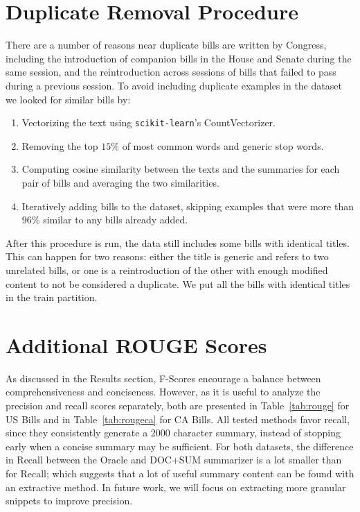 \documentclass[11pt,a4paper]{article}
\begin{document}





\appendix

\section{Duplicate Removal Procedure}
\label{sec:duplicates}
There are a number of reasons near duplicate bills are written by Congress, including the introduction of companion bills in the House and Senate during the same session, and the reintroduction across sessions of bills that failed to pass during a previous session.
To avoid including duplicate examples in the dataset we looked for similar bills by: 
\begin{enumerate}
    \item Vectorizing the text using \texttt{scikit-learn}'s CountVectorizer.
    \item Removing the top $15\%$ of most common words and generic stop words.
    \item Computing cosine similarity between the texts and the summaries for each pair of bills and averaging the two similarities.
    \item Iteratively adding bills to the dataset, skipping examples that were more than $96\%$ similar to any bills already added.
\end{enumerate} 


After this procedure is run, the data still includes some bills with identical titles. This can happen for two reasons: either the title is generic and refers to two unrelated bills, or one is a reintroduction of the other with enough modified content to not be considered a duplicate. We put all the bills with identical titles in the train partition.

\section{Additional ROUGE Scores}

As discussed in the Results section, F-Scores encourage a balance between comprehensiveness and conciseness. However, as it is useful to analyze the precision and recall scores separately, both are presented in Table~\ref{tab:rouge} for US Bills and in Table~\ref{tab:rougeca} for CA Bills. All tested methods favor recall, since they consistently generate a 2000 character summary, instead of stopping early when a concise summary may be sufficient. For both datasets, the difference in Recall between the Oracle and DOC+SUM summarizer is a lot smaller than for Recall; which suggests that a lot of useful summary content can be found with an extractive method. In future work, we will focus on extracting more granular snippets to improve precision.
\end{document}
